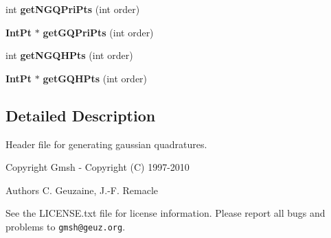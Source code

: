 \begin{DoxyCompactItemize}
\item 
int {\bfseries get\-N\-G\-Q\-Pri\-Pts} (int order)\label{Gauss_8h_abcf4058db693ed39dc76b31e0c2946a6}

\item 
{\bf Int\-Pt} $\ast$ {\bfseries get\-G\-Q\-Pri\-Pts} (int order)\label{Gauss_8h_a2f8e5eb5daaeea23b1ade766c6ea70f8}

\item 
int {\bfseries get\-N\-G\-Q\-H\-Pts} (int order)\label{Gauss_8h_a75833c432cb328b38cbc156566c11b63}

\item 
{\bf Int\-Pt} $\ast$ {\bfseries get\-G\-Q\-H\-Pts} (int order)\label{Gauss_8h_ac3a730f6e490928d142f86d61454eccb}

\end{DoxyCompactItemize}


\subsection{Detailed Description}
Header file for generating gaussian quadratures. \begin{DoxyCopyright}{Copyright}
Gmsh -\/ Copyright (C) 1997-\/2010 
\end{DoxyCopyright}
\begin{DoxyAuthor}{Authors}
C. Geuzaine, J.-\/\-F. Remacle
\end{DoxyAuthor}
See the L\-I\-C\-E\-N\-S\-E.\-txt file for license information. Please report all bugs and problems to {\tt gmsh@geuz.\-org}. 